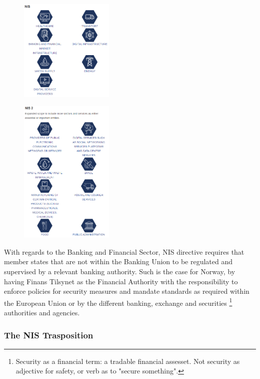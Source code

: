 \begin{figure}[H]
    \includegraphics[width=0.4\textwidth]{tex/NIS1_Sectors_and_Scope.png}
\end{figure}
\begin{figure}[H]
    \includegraphics[width=0.4\textwidth]{tex/NIS2_Sectors_and_Scope.png}
\end{figure}

With regards to the Banking and Financial Sector, NIS directive requires that member states that are not within the Banking Union to be regulated and supervised by a relevant banking authority. Such is the case for Norway, by having Finans Tilsynet as the Financial Authority with the responsibility to enforce policies for security measures and mandate standards as required within the European Union or by the different banking, exchange and securities \footnote[5]{Security as a financial term: a tradable financial assesset. Not security as adjective for safety, or verb as to "secure something".} authorities and agencies.

\subsubsection{The NIS Trasposition}

